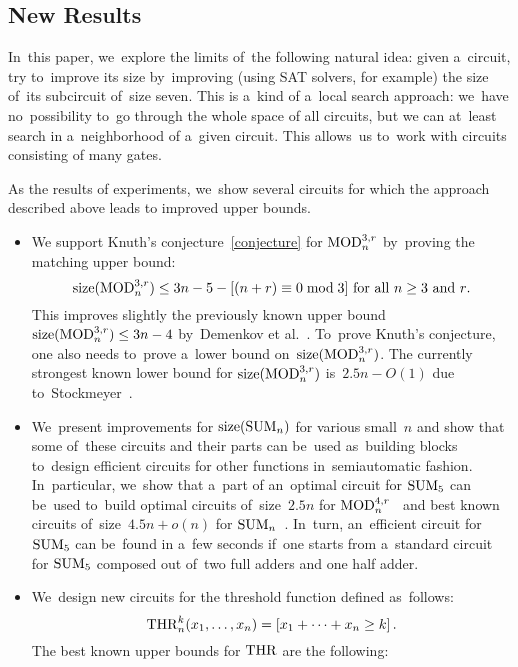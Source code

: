 \subsection{New Results}
In~this paper, we~explore the limits of~the following natural idea: given a~circuit, try to~improve its size by~improving (using SAT solvers, for example) the size
of~its subcircuit of~size seven. This is a~kind of a~local search approach: we~have no~possibility to~go through the whole space of all circuits, but we can at~least
search in a~neighborhood of a~given circuit.
This allows~us to~work with circuits consisting
of many gates.

As the results of experiments, we~show several circuits
for which the approach described above leads to improved upper bounds.
\begin{itemize}
    \item We support Knuth's conjecture~\eqref{conjecture} for $\operatorname{MOD}_n^{3,r}$ by~proving the matching upper bound:
    \[\operatorname{size}(\operatorname{MOD}_n^{3,r}) \le 3n-5-[(n+r) \equiv 0\bmod 3] \text{ for all $n \ge 3$ and $r$.}\]
    This improves slightly the previously known upper bound $\operatorname{size}(\operatorname{MOD}_n^{3,r}) \le 3n-4$ by~Demenkov et al.~\cite{DBLP:journals/ipl/DemenkovKKY10}.
    To~prove Knuth's conjecture, one also needs to~prove a~lower bound 
    on~$\operatorname{size}(\operatorname{MOD}_n^{3,r})$. The currently strongest known lower bound for $\operatorname{size}(\operatorname{MOD}_n^{3,r})$
    is~$2.5n-O(1)$ due to~Stockmeyer~\cite{DBLP:journals/mst/Stockmeyer77}.
    \item We~present improvements for $\operatorname{size}(\operatorname{SUM}_n)$ for various small~$n$ and show that some of~these circuits and their parts can be~used as~building blocks to~design efficient circuits for other functions in~semiautomatic fashion. In~particular, we~show that a~part of an~optimal circuit for $\operatorname{SUM}_5$ can be~used to~build optimal circuits of~size~$2.5n$ for $\operatorname{MOD}_n^{4,r}$~\cite{DBLP:journals/mst/Stockmeyer77} and best known circuits of~size~$4.5n+o(n)$ for $\operatorname{SUM}_n$~\cite{DBLP:journals/ipl/DemenkovKKY10}.
    In~turn, an~efficient circuit for $\operatorname{SUM}_5$ can be~found
    in a~few seconds if~one starts from a~standard circuit for $\operatorname{SUM}_5$ composed
    out of~two full adders and one half adder.
    \item We~design new circuits for the threshold function defined as~follows:
    \[\operatorname{THR}_n^k(x_1, \dotsc, x_n)=[x_1+\dotsb+x_n \ge k] \, .\]
    The best known upper bounds for $\operatorname{THR}$ are the following:
    \begin{align*}

\end{align*}
\end{itemize}
